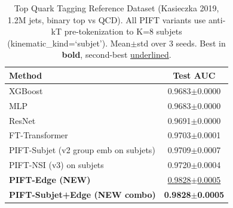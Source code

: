 \begin{table}[t]
\centering
\caption{Top Quark Tagging Reference Dataset (Kasieczka 2019, 1.2M jets, binary top vs QCD).  All PIFT variants use anti-kT pre-tokenization to K=8 subjets (kinematic\_kind=`subjet').  Mean$\pm$std over 3 seeds.  Best in \textbf{bold}, second-best \underline{underlined}.}
\label{tab:top_tagging}
\footnotesize
\begin{tabular}{l c}
\toprule
Method & Test AUC \\
\midrule
XGBoost & 0.9683{\tiny$\pm$0.0000} \\
MLP & 0.9683{\tiny$\pm$0.0000} \\
ResNet & 0.9691{\tiny$\pm$0.0000} \\
FT-Transformer & 0.9703{\tiny$\pm$0.0001} \\
\midrule
PIFT-Subjet (v2 group emb on subjets) & 0.9709{\tiny$\pm$0.0007} \\
PIFT-NSI (v3) on subjets & 0.9720{\tiny$\pm$0.0004} \\
\textbf{PIFT-Edge (NEW)} & \underline{0.9828{\tiny$\pm$0.0005}} \\
\textbf{PIFT-Subjet+Edge (NEW combo)} & \textbf{0.9828{\tiny$\pm$0.0005}} \\
\bottomrule
\end{tabular}
\end{table}
